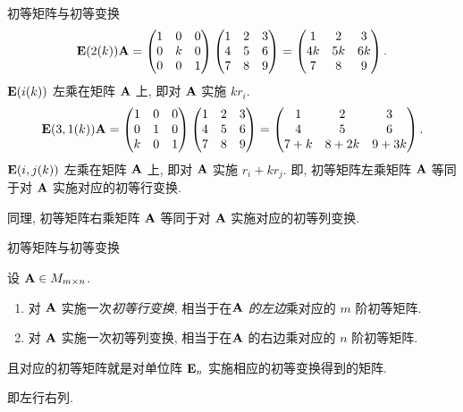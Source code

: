 \begin{frame}{初等矩阵与初等变换}
	\onslide<+->
	\[{\mathbf{E}}(2(k)){\mathbf{A}}=\begin{pmatrix}
		1&0&0\\
		0&k&0\\
		0&0&1
	\end{pmatrix}\begin{pmatrix}
		1&2&3\\
		4&5&6\\
		7&8&9
	\end{pmatrix}=\begin{pmatrix}
		1&2&3\\
		4k&5k&6k\\
		7&8&9
	\end{pmatrix}.\]
	\onslide<+->
	${\mathbf{E}}(i(k))$ 左乘在矩阵 ${\mathbf{A}}$ 上, 即对 ${\mathbf{A}}$ 实施 $kr_i$.
	\onslide<+->
	\[{\mathbf{E}}(3,1(k)){\mathbf{A}}=\begin{pmatrix}
		1&0&0\\
		0&1&0\\
		k&0&1
	\end{pmatrix}\begin{pmatrix}
		1&2&3\\
		4&5&6\\
		7&8&9
	\end{pmatrix}=\begin{pmatrix}
		1&2&3\\
		4&5&6\\
		7+k&8+2k&9+3k
	\end{pmatrix}.\]
	\onslide<+->
	${\mathbf{E}}(i,j(k))$ 左乘在矩阵 ${\mathbf{A}}$ 上, 即对 ${\mathbf{A}}$ 实施 $r_i+kr_j$.
	\onslide<+->
	即, 初等矩阵左乘矩阵 ${\mathbf{A}}$ 等同于对 ${\mathbf{A}}$ 实施对应的初等行变换.

	\onslide<+->
	同理, 初等矩阵右乘矩阵 ${\mathbf{A}}$ 等同于对 ${\mathbf{A}}$ 实施对应的初等列变换.
\end{frame}


\begin{frame}{初等矩阵与初等变换}
	\onslide<+->
	\begin{theorem}
		设 ${\mathbf{A}}\in M_{m\times n}$.
		\begin{enumerate}
			\item 对 ${\mathbf{A}}$ 实施一次\emph{初等行变换}, 相当于在\emph{${\mathbf{A}}$ 的左边}乘对应的 $m$ 阶初等矩阵.
			\item 对 ${\mathbf{A}}$ 实施一次\alert{初等列变换}, 相当于在\alert{${\mathbf{A}}$ 的右边}乘对应的 $n$ 阶初等矩阵.
		\end{enumerate}
		且对应的初等矩阵就是对单位阵 ${\mathbf{E}}_n$ 实施相应的初等变换得到的矩阵.
	\end{theorem}
	\onslide<+->
	即\alert{左行右列}.
\end{frame}



